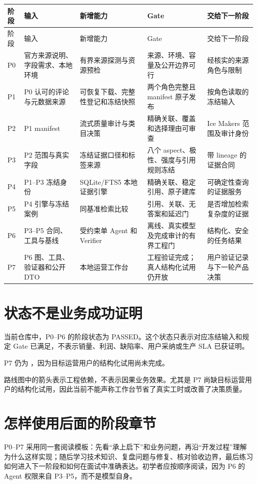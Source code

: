 \small
\begin{longtable}{@{}>{\raggedright\arraybackslash}p{}>{\raggedright\arraybackslash}p{}>{\raggedright\arraybackslash}p{}>{\raggedright\arraybackslash}p{}>{\raggedright\arraybackslash}p{}@{}}
\toprule
阶段 & 输入 & 新增能力 & Gate & 交给下一阶段 \\
\midrule
\endfirsthead
\toprule
阶段 & 输入 & 新增能力 & Gate & 交给下一阶段 \\
\midrule
\endhead
P0 & 官方来源说明、字段需求、本地环境 & 有界来源探测与资源预检 & 来源、环境、容量及公开边界可行 & 经核实的来源角色与限制 \\
P1 & P0 认可的评论与元数据来源 & 可恢复下载、完整性登记和冻结快照 & 两个角色完整且 manifest 原子发布 & 按角色读取的冻结输入 \\
P2 & P1 manifest & 流式质量审计与类目决策 & 精确关联、覆盖和选择理由可审查 & Ice Makers 范围及审计身份 \\
P3 & P2 范围与真实字段 & 冻结证据口径和标签来源 & 八个 aspect、极性、强度与引用规则冻结 & 带 lineage 的证据合同 \\
P4 & P1--P3 冻结身份 & SQLite/FTS5 本地证据引擎 & 精确关联、稳定引用、原子建库 & 可确定性查询的证据服务 \\
P5 & P4 引擎与冻结案例 & 同基准检索比较 & 引用、关联、无答案和延迟门 & 是否增加检索复杂度的证据 \\
P6 & P3--P5 合同、工具与基线 & 受约束单 Agent 和 Verifier & 离线、真实模型及完成审计的有界工程门 & 结构化、安全的任务结果 \\
P7 & P6 图、工具、验证器和公开 DTO & 本地运营工作台 & 工程验证完成；真人结构化试用仍开放 & 用户验证记录与下一轮产品决策 \\
\bottomrule
\end{longtable}
\normalsize

\section{状态不是业务成功证明}

\begin{factbox}
当前仓库中，P0--P6 的阶段状态为 PASSED。这个状态只表示对应冻结输入和规定 Gate 已满足，不表示销量、利润、缺陷率、用户采纳或生产 SLA 已获证明。

P7 仍为 \statusprogress，因为目标运营用户的结构化试用尚未完成。
\end{factbox}

\begin{boundarybox}
路线图中的箭头表示工程依赖，不表示因果业务效果。尤其是 P7 尚缺目标运营用户的结构化试用，因此当前不能声称工作台节省了真实工时或改善了决策质量。
\end{boundarybox}

\section{怎样使用后面的阶段章节}

P0--P7 采用同一套阅读模板：先看“承上启下”和业务问题，再沿“开发过程”理解为什么这样实现；随后学习技术知识、复盘问题与修复、核对验收边界，最后练习如何进入下一阶段和如何在面试中准确表达。初学者应按顺序阅读，因为 P6 的 Agent 权限来自 P3--P5，而不是模型自身。

